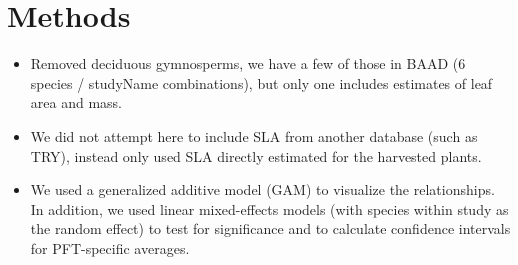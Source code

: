 \documentclass[a4paper]{article}
\begin{document}
\section{Methods}

\begin{itemize}
  \item Removed deciduous gymnosperms, we have a few of those in BAAD (6 species / studyName combinations), but only one includes estimates of leaf area and mass. 
  \item We did not attempt here to include SLA from another database (such as TRY), instead only used SLA directly estimated for the harvested plants.
  \item We used a generalized additive model (GAM) to visualize the relationships. In addition, we used linear mixed-effects models (with species within study as the random effect) to test for significance and to calculate confidence intervals for PFT-specific averages.
\end{itemize}





\end{document}
